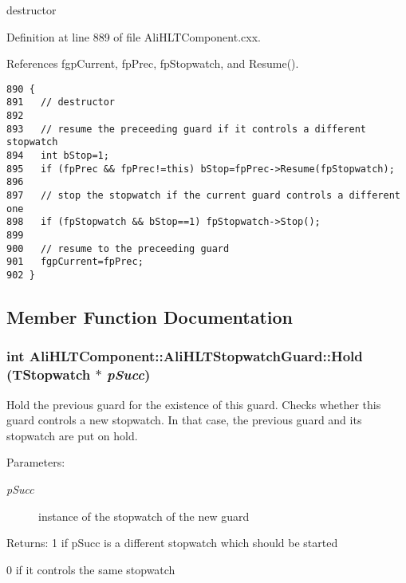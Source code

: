 destructor 

Definition at line 889 of file Ali\-HLTComponent.cxx.

References fgp\-Current, fp\-Prec, fp\-Stopwatch, and Resume().

\footnotesize\begin{verbatim}890 {
891   // destructor
892 
893   // resume the preceeding guard if it controls a different stopwatch
894   int bStop=1;
895   if (fpPrec && fpPrec!=this) bStop=fpPrec->Resume(fpStopwatch);
896 
897   // stop the stopwatch if the current guard controls a different one
898   if (fpStopwatch && bStop==1) fpStopwatch->Stop();
899 
900   // resume to the preceeding guard
901   fgpCurrent=fpPrec;
902 }
\end{verbatim}\normalsize 




\subsection{Member Function Documentation}
\subsubsection{\setlength{\rightskip}{0pt plus 5cm}int Ali\-HLTComponent::Ali\-HLTStopwatch\-Guard::Hold (TStopwatch $\ast$ {\em p\-Succ})\hspace{0.3cm}{\tt  [private]}}\label{classAliHLTComponent_1_1AliHLTStopwatchGuard_d0}


Hold the previous guard for the existence of this guard. Checks whether this guard controls a new stopwatch. In that case, the previous guard and its stopwatch are put on hold. \begin{Desc}
\item[Parameters:]
\begin{description}
\item[{\em p\-Succ}]instance of the stopwatch of the new guard \end{description}
\end{Desc}
\begin{Desc}
\item[Returns:]1 if p\-Succ is a different stopwatch which should be started\par
 0 if it controls the same stopwatch \end{Desc}


